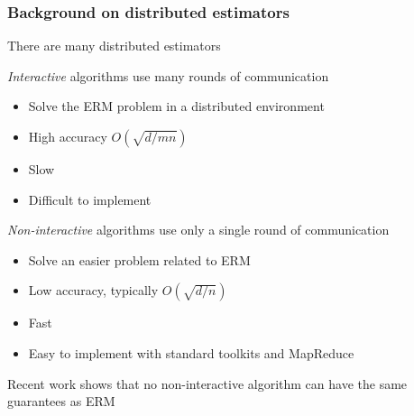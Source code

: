 
\begin{frame}
\frametitle{Background on distributed estimators}

\vspace{0.10in}
There are many distributed estimators

\vspace{0.10in}
\emph{Interactive} algorithms use many rounds of communication
\begin{itemize}
\item Solve the ERM problem in a distributed environment
\item High accuracy $O(\sqrt{d/mn})$
\item Slow 
\item Difficult to implement
\end{itemize}

\vspace{0.10in}
\emph{Non-interactive} algorithms use only a single round of communication
\begin{itemize}
\item Solve an easier problem related to ERM
\item Low accuracy, typically $O(\sqrt{d/n})$
\item Fast 
\item Easy to implement with standard toolkits and MapReduce
\end{itemize}

\vspace{0.10in}
Recent work shows that no non-interactive algorithm can have the same guarantees as ERM

\end{frame}




